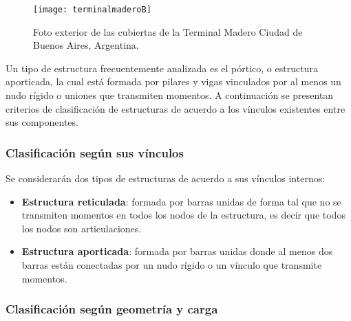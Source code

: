 \begin{figure}[htb]
	\centering
	\texttt{[image: terminalmaderoB]}
  \caption{Foto exterior de las cubiertas de la Terminal Madero Ciudad de Buenos Aires, Argentina.}
\label{fig:termmadero}
\end{figure}

Un tipo de estructura frecuentemente analizada es el pórtico, o estructura aporticada, la cual está formada por pilares y vigas vinculados por al menos un nudo rígido o uniones que transmiten momentos. %
%
A continuación se presentan criterios de clasificación de estructuras de acuerdo a los vínculos existentes entre sus componentes.




\subsubsection{Clasificación según sus vínculos}

Se considerarán dos tipos de estructuras de acuerdo a sus vínculos internos:
%
\begin{itemize}
\item \textbf{Estructura reticulada}: formada por barras unidas de forma tal que no se transmiten momentos en todos los nodos de la estructura, es decir que todos los nodos son articulaciones.
%
\item \textbf{Estructura aporticada}: formada por barras unidas donde al menos dos barras están conectadas por un nudo rígido o un vínculo que transmite momentos.
\end{itemize}




\subsubsection{Clasificación según geometría y carga} \label{sec:clasifest}

